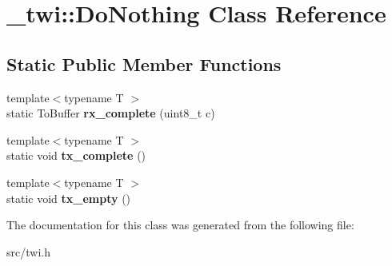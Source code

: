 \hypertarget{class__twi_1_1DoNothing}{}\section{\+\_\+twi\+:\+:Do\+Nothing Class Reference}
\label{class__twi_1_1DoNothing}
\subsection*{Static Public Member Functions}
\begin{DoxyCompactItemize}
\item 
{\footnotesize template$<$typename T $>$ }\\static To\+Buffer {\bfseries rx\+\_\+complete} (uint8\+\_\+t c)\hypertarget{class__twi_1_1DoNothing_a3c5c8b082aadd118ec8987b55bef1f54}{}\label{class__twi_1_1DoNothing_a3c5c8b082aadd118ec8987b55bef1f54}

\item 
{\footnotesize template$<$typename T $>$ }\\static void {\bfseries tx\+\_\+complete} ()\hypertarget{class__twi_1_1DoNothing_a72ff5f982285204fbf52b6b1d01365c9}{}\label{class__twi_1_1DoNothing_a72ff5f982285204fbf52b6b1d01365c9}

\item 
{\footnotesize template$<$typename T $>$ }\\static void {\bfseries tx\+\_\+empty} ()\hypertarget{class__twi_1_1DoNothing_a6c378eb3e2b2ab309d2125ff40f78882}{}\label{class__twi_1_1DoNothing_a6c378eb3e2b2ab309d2125ff40f78882}

\end{DoxyCompactItemize}


The documentation for this class was generated from the following file\+:\begin{DoxyCompactItemize}
\item 
src/twi.\+h\end{DoxyCompactItemize}
